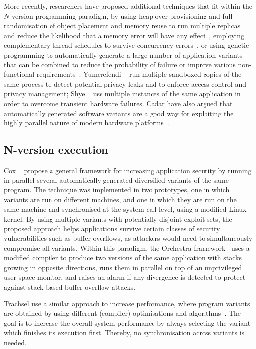 More recently, researchers have proposed additional techniques that fit within
the $N$-version programming paradigm, \eg by using heap over-provisioning and
full randomisation of object placement and memory reuse to run multiple
replicas and reduce the likelihood that a memory error will have any
effect~\cite{diehard06}, employing complementary thread schedules to survive
concurrency errors~\cite{compl-schedules11}, or using genetic programming to
automatically generate a large number of application variants that can be
combined to reduce the probability of failure or improve various non-functional
requirements~\cite{gismoe}. Yumerefendi \etal~\cite{tightlip} run multiple
sandboxed copies of the same process to detect potential privacy leaks and to
enforce access control and privacy management; Shye \etal~\cite{shye2009} use
multiple instances of the same application in order to overcome transient
hardware failures. Cadar \etal have also argued that automatically generated
software variants are a good way for exploiting the highly parallel nature of
modern hardware platforms~\cite{multiplicity}.

\subsection{N-version execution}

Cox \etal~\cite{cox2006} propose a general framework for increasing
application security by running in parallel several
automatically-generated diversified variants of the same program.  The
technique was implemented in two prototypes, one in which variants are
run on different machines, and one in which they are run on the same
machine and synchronised at the system call level, using a modified
Linux kernel.
By using multiple variants with potentially disjoint exploit sets,
the proposed approach helps applications survive certain classes of
security vulnerabilities such as buffer overflows, as attackers
would need to simultaneously compromise all variants.
Within this paradigm, the Orchestra framework~\cite{orchestra09} uses
a modified compiler to produce two versions of the same application
with stacks growing in opposite directions, runs them in parallel on
top of an unprivileged user-space monitor, and raises an alarm if any
divergence is detected to protect against stack-based buffer overflow
attacks.

Trachsel \etal use a similar approach to increase performance, where
program variants are obtained by using different (compiler)
optimisations and algorithms~\cite{trachsel10}.  The goal is to
increase the overall system performance by always selecting the
variant which finishes its execution first. Thereby, no
synchronisation across variants is needed.  %

